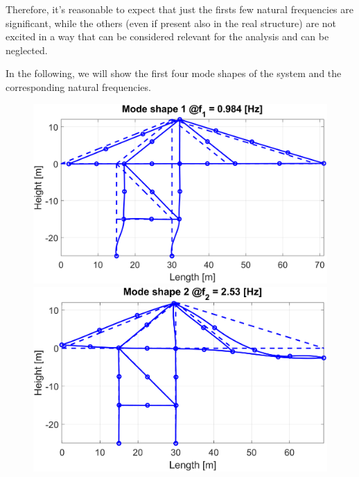 Therefore, it's reasonable to expect that just the firsts few natural frequencies are significant, while the others (even if present also in the real structure) are not excited in a way that can be considered relevant for the analysis and can be neglected.

In the following, we will show the first four mode shapes of the system and the corresponding natural frequencies.

\begin{figure}[H]
    \begin{minipage}[b]{0.45\textwidth}
        \centering
        \includegraphics[width=\textwidth]{img/MATLAB/ModeShapes/Mode_01.png}
    \end{minipage}
    \hfill
    \begin{minipage}[b]{0.45\textwidth}
        \centering
        \includegraphics[width=\textwidth]{img/MATLAB/ModeShapes/Mode_02.png}
    \end{minipage}
    \begin{minipage}[b]{0.45\textwidth}

\end{minipage}
\end{figure}
